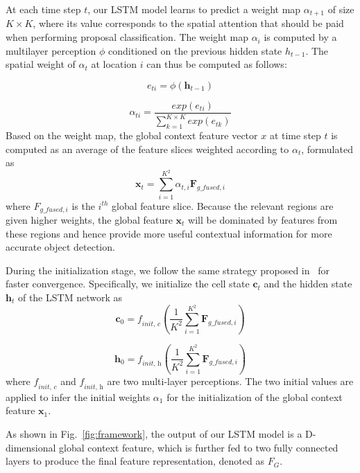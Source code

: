 \documentclass[journal]{IEEEtran}
\begin{document}
At each time step $t$, our LSTM model learns to predict a weight map $\alpha_{t+1}$ of size $K\times K$, where its value corresponds to the spatial attention that should be paid when performing proposal classification. The weight map \textit{$\alpha_{i}$} is computed by a multilayer perception $\phi$ conditioned on the previous hidden state \textit{$h_{t-1}$}. The spatial weight of $\alpha_{t}$ at location $i$ can thus be computed as follows: 

\begin{equation}
  e_{ti} = \phi(\bm{h}_{t-1}) 
\end{equation}

\begin{equation}{\alpha}_{ti} = \frac{exp(e_{ti})}{\sum_{k=1}^{K \times K}exp(e_{tk})}
\end{equation}
Based on the weight map, the global context feature vector $x$ at time step $t$ is computed as an average of the feature slices weighted according to $\alpha_{t}$, formulated as
\begin{equation}
  \bm{x}_{t} = \sum_{i=1}^{K^{2}}{{\alpha}_{t,i}\bm{F}_{g\_fused, i}}
\end{equation}
where $F_{g\_fused, i}$ is the $i^{th}$ global feature slice. Because the relevant regions are given higher weights, the global feature $\bm{x}_{t}$ will be dominated by features from these regions and hence provide more useful contextual information for more accurate object detection.

During the initialization stage, we follow the same strategy proposed in~\cite{show2015tell} for faster convergence. Specifically, we initialize the cell state $\bm{c}_t$ and the hidden state $\bm{h}_t$ of the LSTM network as 
\begin{equation}
  \bm{c}_0 = \textit{f}_{\textit{init, c}} \left(\frac{1}{K^2}\sum_{i=1}^{K^2}\bm{F}_{g\_fused, i} \right)
\end{equation}

\begin{equation}
  \bm{h}_0 = \textit{f}_{\textit{init, h}} \left(\frac{1}{K^2}\sum_{i=1}^{K^2}\bm{F}_{g\_fused, i} \right)
\end{equation}
where $\textit{f}_{\textit{init, c}}$ and $\textit{f}_{\textit{init, h}}$ are two multi-layer perceptions. The two initial values are applied to infer the initial weights $\alpha_1$ for the initialization of the global context feature $\bm{x}_1$.

As shown in Fig.~\ref{fig:framework}, the output of our LSTM model is a D-dimensional global context feature, which is further fed to two fully connected layers to produce the final feature representation, denoted as $F_G$.
\end{document}
